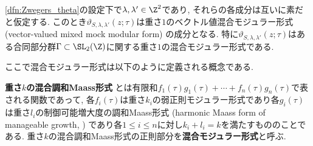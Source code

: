 \documentclass[11pt,b5paper,oneside,lualatex]{ltjsarticle} %
\numberwithin{equation}{section} %
\begin{document}
\begin{thm}
	\cref{dfn:Zwegers_theta}の設定下で$ \lambda, \lambda' \in \Z^2 $であり, それらの各成分は互いに素だと仮定する. 
	このとき$ \vartheta_{S, \lambda, \lambda'} \left( z; \tau \right) $は重さ$ 1 $のベクトル値混合モジュラー形式 (vector-valued mixed mock modular form) の成分となる. 
	特に$ \vartheta_{S, \lambda, \lambda'} \left( z; \tau \right) $はある合同部分群$ \Gamma \subset \SL_2(\Z) $に関する重さ$ 1 $の混合モジュラー形式である. 
\end{thm}

ここで混合モジュラー形式は以下のように定義される概念である. 

\begin{dfn}
	\textbf{重さ$ k $の混合調和Maass形式}%
	とは有限和$ f_1(\tau) g_1(\tau) + \cdots + f_n(\tau) g_n(\tau) $で表される関数であって, 各$ f_i(\tau) $は重さ$ k_i $の弱正則モジュラー形式であり各$ g_i(\tau) $は重さ$ l_i $の制御可能増大度の調和Maass形式 (harmonic Maass form of manageable growth, \cite[Definition 4.1]{BFOR}) であり各$ 1 \le i \le n $に対し$ k_i + l_i = k $を満たすもののことである. 
	重さ$ k $の混合調和Maass形式の正則部分を\textbf{混合モジュラー形式}と呼ぶ. 
\end{dfn}





\subsection{} \label{subsec:}










\subsection{} \label{subsec:}

\end{document}
